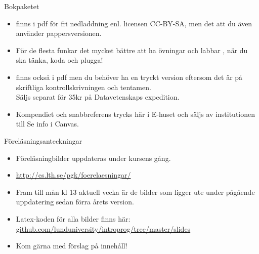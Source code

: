 \else


\begin{SlideExtra}{Bokpaketet}\SlideFontSmall
\begin{itemize}

\item {} finns i pdf för fri nedladdning enl. licensen CC-BY-SA, men det  att du även använder pappersversionen.

\item För de flesta funkar det mycket bättre att ha övningar och labbar  , när du ska tänka, koda och plugga!

\item {} finns också i pdf men du behöver ha en tryckt version eftersom det är  på skriftliga kontrollskrivningen och tentamen. \\ Säljs separat för 35kr på Datavetenskaps expedition.

\item Kompendiet och snabbreferens trycks här i E-huset och säljs av institutionen till  Se info i Canvas.

\end{itemize}
\end{SlideExtra}

\begin{SlideExtra}{Föreläsningsanteckningar}
\begin{itemize}
\item Föreläsningbilder uppdateras under kursens gång.
\item \url{http://cs.lth.se/pgk/foerelaesningar/}
\item Fram till mån kl 13 aktuell vecka är de bilder som ligger ute under pågående uppdatering sedan förra årets version.
\item Latex-koden för alla bilder finns här: \\
\href{https://github.com/lunduniversity/introprog/tree/master/slides}{github.com/lunduniversity/introprog/tree/master/slides}
\item Kom gärna med förslag på innehåll!
\end{itemize}
\end{SlideExtra}
\fi

